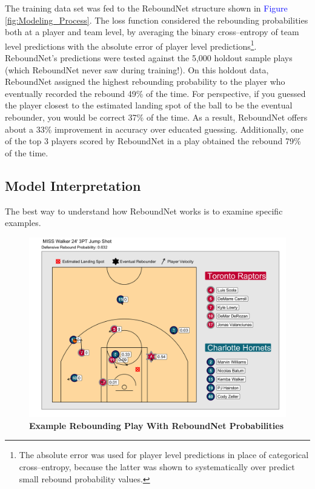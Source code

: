 \documentclass{article}
\begin{document}
\bigbreak
\noindent
The training data set was fed to the ReboundNet structure shown in \textcolor{blue}{Figure} \ref{fig:Modeling_Process}. The loss function considered the rebounding probabilities both at a player and team level, by averaging the binary cross--entropy of team level predictions with the absolute error of player level predictions\footnote{The absolute error was used for player level predictions in place of categorical cross--entropy, because the latter was shown to systematically over predict small rebound probability values.}. ReboundNet's predictions were tested against the 5,000 holdout sample plays (which ReboundNet never saw during training!). On this holdout data, ReboundNet assigned the highest rebounding probability to the player who eventually recorded the rebound 49\% of the time. For perspective, if you guessed the player closest to the estimated landing spot of the ball to be the eventual rebounder, you would be correct 37\% of the time. As a result, ReboundNet offers about a 33\% improvement in accuracy over educated guessing. Additionally, one of the top 3 players scored by ReboundNet in a play obtained the rebound 79\% of the time.

\subsection{Model Interpretation}

The best way to understand how ReboundNet works is to examine specific examples.

\begin{figure}[htb]
\centering
\includegraphics[width=1\columnwidth]{ReboundEx.png}
\caption{\bf{Example Rebounding Play With ReboundNet Probabilities}}
\label{fig:ReboundEx}
\end{figure}
\end{document}

